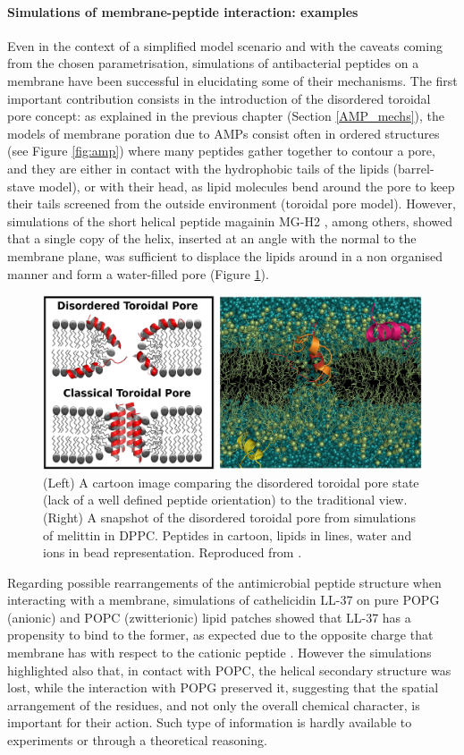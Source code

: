 \paragraph{Simulations of membrane-peptide interaction: examples} Even in the context of a simplified model scenario and with the caveats coming from the chosen parametrisation, simulations of antibacterial peptides on a membrane have been successful in elucidating some of their mechanisms.
%
The first important contribution consists in the introduction of the disordered toroidal pore concept: as explained in the previous chapter (Section \ref{AMP_mechs}), the models of membrane poration due to AMPs consist often in ordered structures (see Figure \ref{fig:amp}) %
where many peptides gather together to contour a pore, and they are either in contact with the hydrophobic tails of the lipids (barrel-stave model), or with their head, as lipid molecules bend around the pore to keep their tails screened from the outside environment (toroidal pore model). However, simulations of the short helical peptide magainin MG-H2 \citep{Leontiadou2006}, among others, showed that a single copy of the helix, inserted at an angle with the normal to the membrane plane, was sufficient to displace the lipids around in a non organised manner and form a water-filled pore (Figure \ref{fig:dis_pore}).
%
\begin{figure}[t!]
\centering
\includegraphics[width=0.8\linewidth]{2methods/pics/disordered_pore.jpg}
%
\caption[Disordered pore model]{(Left) A cartoon image comparing the disordered toroidal pore state (lack of a well defined peptide orientation) to the traditional view. (Right) A snapshot of the disordered toroidal pore from simulations of melittin in DPPC. Peptides in cartoon, lipids in lines, water and ions in bead representation. Reproduced from \citet{Sengupta2008}.}
\label{fig:dis_pore}
\end{figure}

Regarding possible rearrangements of the antimicrobial peptide structure when interacting with a membrane, simulations of cathelicidin LL-37 on pure POPG (anionic) and POPC (zwitterionic) lipid patches showed that LL-37 has a propensity to bind to the former, as expected due to the opposite charge that membrane has with respect to the cationic peptide \citep{Zhao2018}. However the simulations highlighted also that, in contact with POPC, the helical secondary structure was lost, while the interaction with POPG preserved it, suggesting that the spatial arrangement of the residues, and not only the overall chemical character, is important for their action. Such type of information is hardly available to experiments or through a theoretical reasoning.

